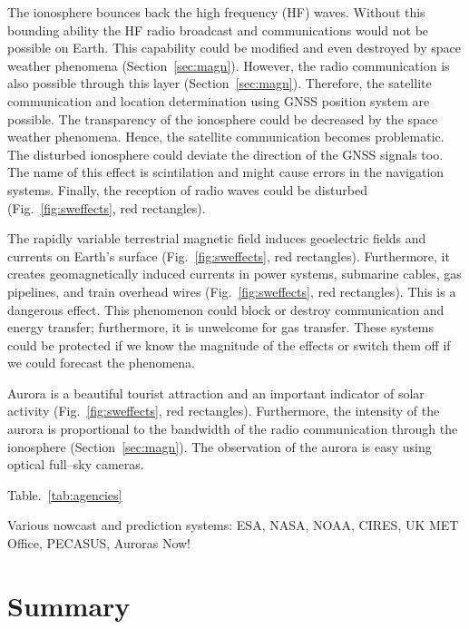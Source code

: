 \documentclass[sn-aps]{sn-jnl}%
\begin{document}
The ionosphere bounces back the high frequency (HF) waves. Without this bounding ability the HF radio broadcast and communications would not be possible on Earth. This capability could be modified and even destroyed by space weather phenomena (Section~\ref{sec:magn}). However, the radio communication is also possible through this layer (Section~\ref{sec:magn}). Therefore, the satellite communication and location determination using GNSS position system are possible. The transparency of the ionosphere could be decreased by the space weather phenomena. Hence, the satellite communication becomes problematic. The disturbed ionosphere could deviate the direction of the GNSS signals too. The name of this effect is scintilation and might cause errors in the navigation systems. Finally, the reception of radio waves could be disturbed (Fig.~\ref{fig:sweffects}, red rectangles).

The rapidly variable terrestrial magnetic field induces geoelectric fields and currents on Earth's surface (Fig.~\ref{fig:sweffects}, red rectangles). Furthermore, it creates geomagnetically induced currents in power systems, submarine cables, gas pipelines, and train overhead wires (Fig.~\ref{fig:sweffects}, red rectangles). This is a dangerous effect. This phenomenon could block or destroy communication and energy transfer; furthermore, it is unwelcome for gas transfer. These systems could be protected if we know the magnitude of the effects or switch them off if we could forecast the phenomena. 

Aurora is a beautiful tourist attraction and an important indicator of solar activity (Fig.~\ref{fig:sweffects}, red rectangles). Furthermore, the intensity of the aurora is proportional to the bandwidth of the radio communication through the ionosphere (Section~\ref{sec:magn}). The observation of the aurora is easy using optical full--sky cameras.

Table.~\ref{tab:agencies}

Various nowcast and prediction systems: ESA, NASA, NOAA, CIRES, UK MET Office, PECASUS, Auroras Now!

\section{Summary}
\label{sec:sum}
\end{document}
